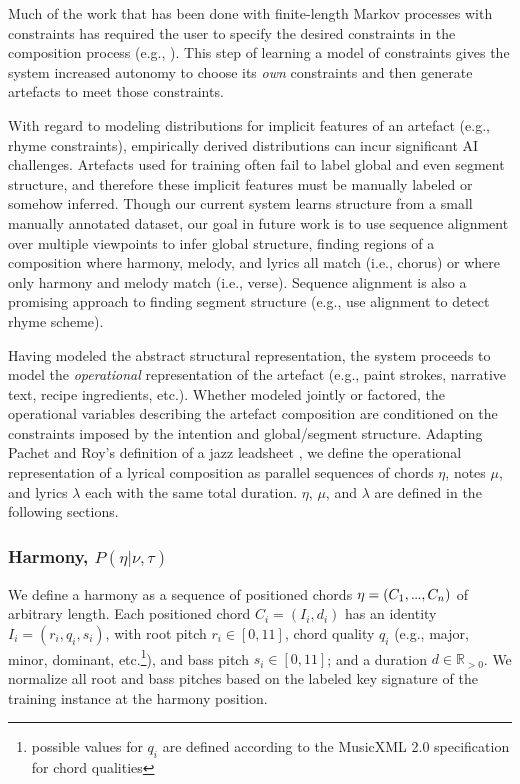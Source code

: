\documentclass[phd,electronic,oneside,twosidetoc,letterpaper,chaptercenter,parttop,lof,lot]{byumsphd}
\newcommand\mydots{\hbox to .75em{.\hss.\hss.}}
\begin{document}
Much of the work that has been done with finite-length Markov processes with constraints has required the user to specify the desired constraints in the composition process (e.g., \cite{pachet2014imitative,barbieri2012markov}). This step of learning a model of constraints gives the system increased autonomy to choose its \emph{own} constraints and then generate artefacts to meet those constraints.

With regard to modeling distributions for implicit features of an artefact (e.g., rhyme constraints), empirically derived distributions can incur significant AI challenges. Artefacts used for training often fail to label global and even segment structure, and therefore these implicit features must be manually labeled or somehow inferred. Though our current system learns structure from a small manually annotated dataset, our goal in future work is to use sequence alignment over multiple viewpoints to infer global structure, finding regions of a composition where harmony, melody, and lyrics all match (i.e., chorus) or where only harmony and melody match (i.e., verse). Sequence alignment is also a promising approach to finding segment structure (e.g., \citeauthor{hirjee2010using} \cite{hirjee2010using} use alignment to detect rhyme scheme).

Having modeled the abstract structural representation, the system proceeds to model the \emph{operational} representation of the artefact (e.g., paint strokes, narrative text, recipe ingredients, etc.). Whether modeled jointly or factored, the operational variables describing the artefact composition are conditioned on the constraints imposed by the intention and global/segment structure. Adapting Pachet and Roy's definition of a jazz leadsheet \cite{pachet2014imitative}, we define the operational representation of a lyrical composition as parallel sequences of chords $\eta$, notes $\mu$, and lyrics $\lambda$ each with the same total duration. $\eta$, $\mu$, and $\lambda$ are defined in the following sections.

\subsubsection{Harmony, $P(\eta|\nu,\tau)$}

We define a harmony as a sequence of positioned chords $\eta = (C_1,\mydots,C_n)$ of arbitrary length. Each positioned chord $C_i = (I_i,d_i)$ has an identity $I_i = (r_i,q_i,s_i)$, with root pitch $r_i\in[0,11]$, chord quality $q_i$ (e.g., major, minor, dominant, etc.\footnote{possible values for $q_i$ are defined according to the MusicXML 2.0 specification for chord qualities}), and bass pitch $s_i\in[0,11]$; and a duration $d \in \mathbb{R}_{>0}$. We normalize all root and bass pitches based on the labeled key signature of the training instance at the harmony position.
\end{document}
